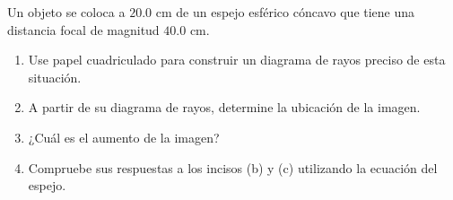 \item Un objeto se coloca a $20.0\text{ cm}$ de un espejo esférico cóncavo que tiene una distancia focal de magnitud $40.0\text{ cm}$.
\begin{enumerate}
    \item Use papel cuadriculado para construir un diagrama de rayos preciso de esta situación.
    \item A partir de su diagrama de rayos, determine la ubicación de la imagen.
    \item ¿Cuál es el aumento de la imagen?
    \item Compruebe sus respuestas a los incisos (b) y (c) utilizando la ecuación del espejo.
\end{enumerate}